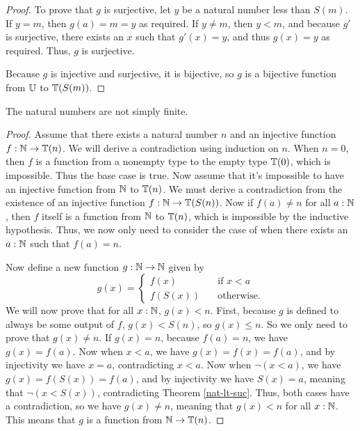 \documentclass[../math.tex]{subfiles}
\begin{document}
\begin{proof}
    To prove that $g$ is surjective, let $y$ be a natural number less than
    $S(m)$.  If $y = m$, then $g(a) = m = y$ as required.  If $y \neq m$, then
    $y < m$, and because $g'$ is surjective, there exists an $x$ such that
    $g'(x) = y$, and thus $g(x) = y$ as required.  Thus, $g$ is surjective.

    Because $g$ is injective and surjective, it is bijective, so $g$ is a
    bijective function from $\mathbb{U}$ to $\mathbb{T}(S(m))$.
\end{proof}

\begin{theorem} \label{nat-not-finite}
    The natural numbers are not simply finite.
\end{theorem}
\begin{proof}
    Assume that there exists a natural number $n$ and an injective function $f :
    \mathbb{N} \to \mathbb{T}(n)$.  We will derive a contradiction using induction on $n$.  When
    $n = 0$, then $f$ is a function from a nonempty type to the empty type
    $\mathbb{T}(0)$, which is impossible.  Thus the base case is true.  Now assume that
    it's impossible to have an injective function from $\mathbb{N}$ to $\mathbb{T}(n)$.  We must
    derive a contradiction from the existence of an injective function $f : \mathbb{N}
    \to \mathbb{T}(S(n))$.  Now if $f(a) \neq n$ for all $a : \mathbb{N}$, then $f$ itself is a
    function from $\mathbb{N}$ to $\mathbb{T}(n)$, which is impossible by the inductive
    hypothesis.  Thus, we now only need to consider the case of when there
    exists an $a : \mathbb{N}$ such that $f(a) = n$.

    Now define a new function $g : \mathbb{N} \to \mathbb{N}$ given by
    \[
        g(x) = \begin{cases}
            f(x) \quad &\text{if $x < a$} \\
            f(S(x)) \quad &\text{otherwise.}
        \end{cases}
    \]
    We will now prove that for all $x : \mathbb{N}$, $g(x) < n$.  First, because $g$ is
    defined to always be some output of $f$, $g(x) < S(n)$, so $g(x) \leq n$.
    So we only need to prove that $g(x) \neq n$.  If $g(x) = n$, because $f(a) =
    n$, we have $g(x) = f(a)$.  Now when $x < a$, we have $g(x) = f(x) = f(a)$,
    and by injectivity we have $x = a$, contradicting $x < a$.  Now when $\neg(x
    < a)$, we have $g(x) = f(S(x)) = f(a)$, and by injectivity we have $S(x) =
    a$, meaning that $\neg(x < S(x))$, contradicting Theorem \ref{nat-lt-suc}.
    Thus, both cases have a contradiction, so we have $g(x) \neq n$, meaning
    that $g(x) < n$ for all $x : \mathbb{N}$.  This means that $g$ is a function from
    $\mathbb{N} \to \mathbb{T}(n)$.


\end{proof}
\end{document}
